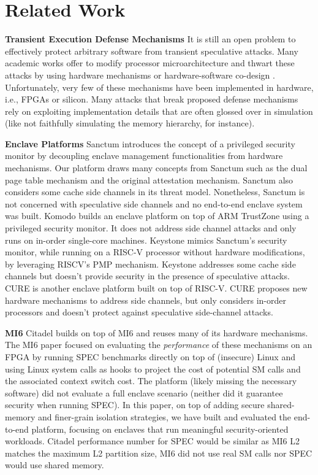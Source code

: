 \section{Related Work}
\textbf{Transient Execution Defense Mechanisms}
It is still an open problem to effectively protect arbitrary software from transient speculative attacks.
Many academic works offer to modify processor microarchitecture and thwart these attacks by using hardware mechanisms or hardware-software co-design \cite{ainsworth2020muontrap, cheang2019formal, canella2019systematic, barber2019specshield, fustos2019spectreguard, yan2018invisispec, yu2019speculative, saileshwar2019cleanupspec, weisse2019nda, khasawneh2019safespec}.
Unfortunately, very few of these mechanisms have been implemented in hardware, i.e., FPGAs or silicon.
Many attacks that break proposed defense mechanisms rely on exploiting implementation details that are often glossed over in simulation (like not faithfully simulating the memory hierarchy, for instance).

\textbf{Enclave Platforms}
Sanctum \cite{costan2016sanctum} introduces the concept of a privileged security monitor by decoupling enclave management functionalities from hardware mechanisms. Our platform draws many concepts from Sanctum  such as the dual page table mechanism and the original attestation mechanism. Sanctum also considers some cache side channels in its threat model.
Nonetheless, Sanctum is not concerned with speculative side channels and no end-to-end enclave system was built.
Komodo \cite{ferraiuolo2017komodo} builds an enclave platform on top of ARM TrustZone \cite{trustzone04} using a privileged security monitor.
It does not address side channel attacks and only runs on in-order single-core machines.
Keystone \cite{lee2020keystone} mimics Sanctum's security monitor, while running on a RISC-V processor without hardware modifications, by leveraging RISCV's PMP mechanism.
Keystone addresses some cache side channels but doesn't provide security in the presence of speculative attacks.
CURE \cite{bahmani2021cure} is another enclave platform built on top of RISC-V. 
CURE proposes new hardware mechanisms to address side channels, but only considers in-order processors and doesn't protect against speculative side-channel attacks.

\textbf{MI6}
Citadel builds on top of MI6 \cite{bourgeat2019mi6} and reuses many of its hardware mechanisms. 
The MI6 paper focused on evaluating the \emph{performance} of these mechanisms on an FPGA
by running SPEC benchmarks directly on top of (insecure) Linux and using Linux system calls as hooks to project the cost of potential SM calls and the associated context switch cost.
The platform (likely missing the necessary software) did not evaluate a full enclave scenario (neither did it guarantee security when running SPEC).
In this paper, on top of adding secure shared-memory and finer-grain isolation strategies, we have built and evaluated the end-to-end platform, focusing on enclaves that run meaningful security-oriented workloads.
Citadel performance number for SPEC would be similar as MI6 L2 matches the maximum L2 partition size, MI6 did not use real SM calls nor SPEC would use shared memory.


